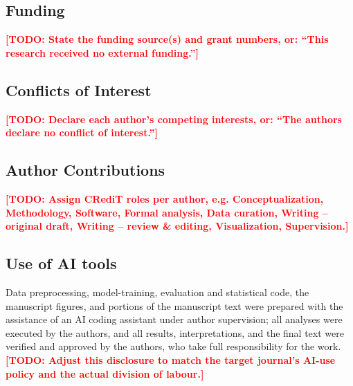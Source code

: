 \documentclass[11pt,a4paper]{article}
\newcommand{\todo}[1]{\textcolor{red}{\textbf{[TODO: #1]}}}
\begin{document}
\subsection*{Funding}
\todo{State the funding source(s) and grant numbers, or: ``This research received
no external funding.''}

\subsection*{Conflicts of Interest}
\todo{Declare each author's competing interests, or: ``The authors declare no
conflict of interest.''}

\subsection*{Author Contributions}
\todo{Assign CRediT roles per author, e.g. Conceptualization, Methodology,
Software, Formal analysis, Data curation, Writing -- original draft, Writing --
review \& editing, Visualization, Supervision.}

\subsection*{Use of AI tools}
Data preprocessing, model-training, evaluation and statistical code, the
manuscript figures, and portions of the manuscript text were prepared with the
assistance of an AI coding assistant under author supervision; all analyses were
executed by the authors, and all results, interpretations, and the final text
were verified and approved by the authors, who take full responsibility for the
work. \todo{Adjust this disclosure to match the target journal's AI-use policy
and the actual division of labour.}



\end{document}
